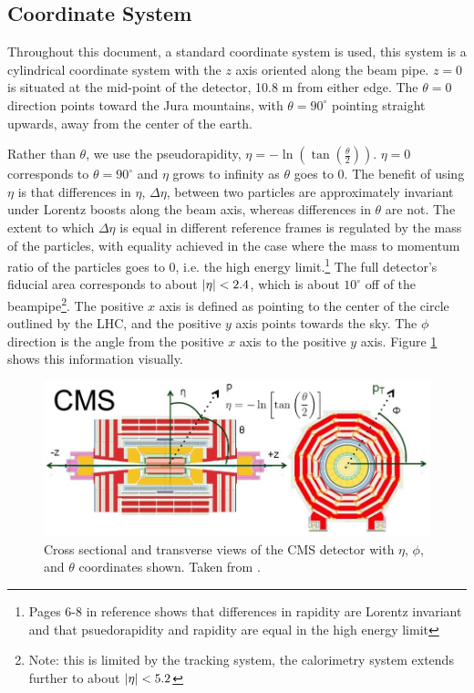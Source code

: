   \subsection{Coordinate System}
    Throughout this document, a standard coordinate system is used, this system is a cylindrical coordinate system with the $z$ axis oriented along the beam pipe. $z=0$ is situated at the mid-point of the detector, 10.8 m from either edge. The $\theta = 0$ direction points toward the Jura mountains, with $\theta = 90^\circ$ pointing straight upwards, away from the center of the earth. 

    Rather than $\theta$, we use the pseudorapidity, $\eta = - \ln \left( \tan\left(\frac{\theta}{2}\right)\right)$. $\eta = 0$ corresponds to $\theta = 90^\circ$ and $\eta$ grows to infinity as $\theta$ goes to 0. The benefit of using $\eta$ is that differences in $\eta$, $\Delta \eta$, between two particles are approximately invariant under Lorentz boosts along the beam axis, whereas differences in $\theta$ are not. The extent to which $\Delta \eta$ is equal in different reference frames is regulated by the mass of the particles, with equality achieved in the case where the mass to momentum ratio of the particles goes to 0, i.e. the high energy limit.\footnote{Pages 6-8 in reference \cite{psuedorapidity} shows that differences in rapidity are Lorentz invariant and that psuedorapidity and rapidity are equal in the high energy limit} The full detector's fiducial area corresponds to about $\lvert \eta \rvert < 2.4$, which is about $10^\circ$ off of the beampipe\footnote{Note: this is limited by the tracking system, the calorimetry system extends further to about $\lvert \eta \rvert < 5.2$}. The positive $x$ axis is defined as pointing to the center of the circle outlined by the LHC, and the positive $y$ axis points towards the sky. The $\phi$ direction is the angle from the positive $x$ axis to the positive $y$ axis. Figure \ref{fig:cms_coordinates} shows this information visually.

    \begin{figure}[h!]
      \centering
      \includegraphics[width=.7\textwidth]{figures/cms_coordinates.jpg}
      \caption{Cross sectional and transverse views of the CMS detector with $\eta$, $\phi$, and $\theta$ coordinates shown. Taken from \cite{cms_coordinates}.}
      \label{fig:cms_coordinates}
    \end{figure}

